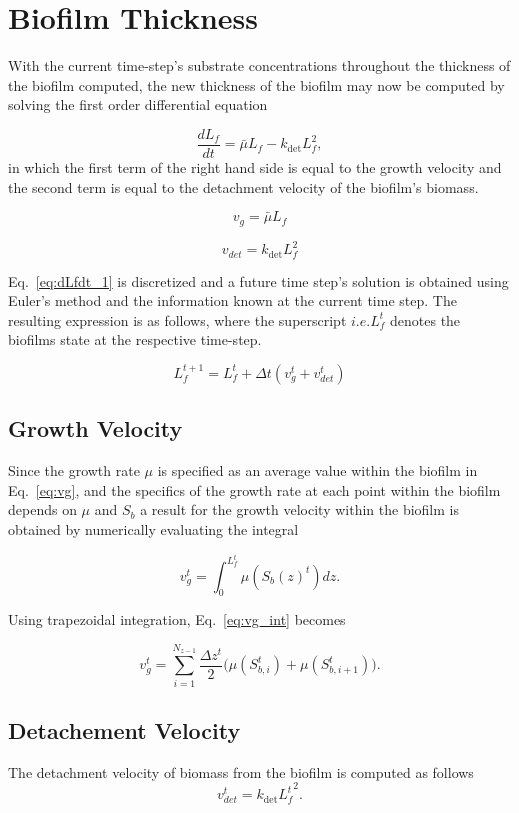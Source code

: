 \documentclass[letterpaper, twoside]{article}
\newcommand{\ie}{i.e.}
\begin{document}
\section{Biofilm Thickness}
With the current time-step's substrate concentrations throughout the thickness of the biofilm computed, the new thickness of the biofilm may now be computed by solving the first order differential equation

\begin{equation}
  \label{eq:dLfdt_1}
  \frac{d L_f}{dt} = {\bar\mu L_f}-{k_{\mathrm{det}}L_f^2},
\end{equation}
in which the first term of the right hand side is equal to the growth velocity and the second term is equal to the detachment velocity of the biofilm's biomass. 

\begin{equation}
  \label{eq:vg}
  v_g={\bar\mu L_f}
\end{equation}

\begin{equation}
  \label{eq:vdet}
  v_{det}={k_{\mathrm{det}}L_f^2}
\end{equation}

Eq.~\ref{eq:dLfdt_1} is discretized and a future time step's solution is obtained using Euler's method and the information known at the current time step. The resulting expression is as follows, where the superscript $\ie L_f^{t}$ denotes the biofilms state at the respective time-step.

\begin{equation}
  \label{eq:dLfdt_2}
  {L_f^{t+1}}={L_f^{t}} + {\Delta t}({v_g^{t}+v_{det}^{t}})
\end{equation}

\subsection{Growth Velocity}
Since the growth rate $\mu$ is specified as an average value within the biofilm in Eq.~\ref{eq:vg}, and the specifics of the growth rate at each point within the biofilm depends on $\mu$ and $S_b$ a result for the growth velocity within the biofilm is obtained by numerically evaluating the integral 

\begin{equation}
  \label{eq:vg_int}
  {v_g^{t}}={\int_{0}^{L_f^{t}}\mu(S_b(z)^{t})dz}.
\end{equation}

Using trapezoidal integration, Eq.~\ref{eq:vg_int} becomes

\begin{equation}
  \label{eq:vg_sum}
  {v_g^{t}}={\sum_{i=1}^{N_{z-1}}  {\frac{\Delta {z^{t}}}{2}}  ( {\mu({S_{b,i}^{t}})+\mu({S_{b,i+1}^{t}})}}).
\end{equation}

\subsection{Detachement Velocity}
The detachment velocity of biomass from the biofilm is computed as follows
\begin{equation}
  \label{eq:vdet2}
  {v_{det}^{t}}={k_{\mathrm{det}}{L^t_f}^2}.
\end{equation}
\end{document}
